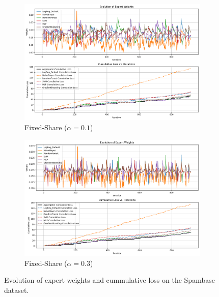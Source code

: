 \documentclass{article}
\begin{document}
\begin{figure}[ht]
\begin{subfigure}[b]{0.3\textwidth}
        \includegraphics[width=\textwidth]{spambase_fixed_0.1.png}
        \caption{Fixed-Share ($\alpha = 0.1$)}
        \label{fig:supervised_fixed_share_weights_0.1}
      \end{subfigure}
      \begin{subfigure}[b]{0.3\textwidth}
        \includegraphics[width=\textwidth]{spambase_fixed_0.3.png}
        \caption{Fixed-Share ($\alpha = 0.3$)}
        \label{fig:supervised_fixed_share_weights_0.3}
      \end{subfigure}
      \caption{Evolution of expert weights and cummulative loss on the Spambase dataset.}
      \label{fig:supervised_comparison}
    \end{figure}
\end{document}

